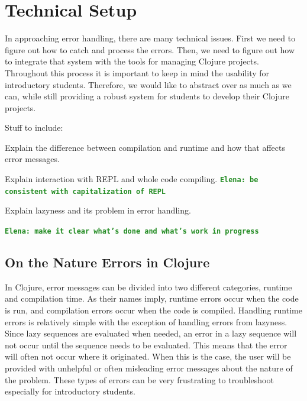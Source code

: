 \documentclass[12pt]{article}
\newcommand{\comment}[1]{{\bf \tt  {#1}}}
\newcommand{\emcomment}[1]{\textcolor{ForestGreen}{\comment{Elena: {#1}}}}
\begin{document}
\section{Technical Setup}\label{sec:technical}
In approaching error handling, there are many technical issues. First we need to figure out how to catch and process the errors. Then, we need to figure out how to integrate that system with the tools for managing Clojure projects. Throughout this process it is important to keep in mind the usability for introductory students. Therefore, we would like to abstract over as much as we can, while still providing a robust system for students to develop their Clojure projects.

Stuff to include:

Explain the difference between compilation and runtime and how that affects error messages.

Explain interaction with REPL and whole code compiling. \emcomment{be consistent with capitalization of REPL} 

Explain lazyness and its problem in error handling.

\emcomment{make it clear what's done and what's work in progress}
\subsection{On the Nature Errors in Clojure}

In Clojure, error messages can be divided into two different categories, runtime and compilation time. As their names imply, runtime errors occur when the code is run, and compilation errors occur when the code is compiled. Handling runtime errors is relatively simple with the exception of handling errors from lazyness. Since lazy sequences are evaluated when needed, an error in a lazy sequence will not occur until    
the sequence needs to be evaluated. This means that the error will often not occur where it originated. When this is the case, the user will be provided with unhelpful or often misleading error messages about the nature of the problem. These types of errors can be very frustrating to troubleshoot especially for introductory students.
\end{document}
